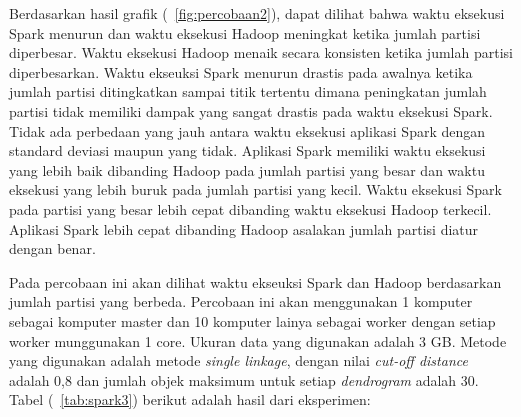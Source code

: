 Berdasarkan hasil grafik (~\ref{fig:percobaan2}), dapat dilihat bahwa waktu eksekusi Spark menurun dan waktu eksekusi Hadoop meningkat ketika jumlah partisi diperbesar. Waktu eksekusi Hadoop menaik secara konsisten ketika jumlah partisi diperbesarkan. Waktu ekseuksi Spark menurun drastis pada awalnya ketika jumlah partisi ditingkatkan sampai titik tertentu dimana peningkatan jumlah partisi tidak memiliki dampak yang sangat drastis pada waktu eksekusi Spark. Tidak ada perbedaan yang jauh antara waktu eksekusi aplikasi Spark dengan standard deviasi maupun yang tidak. Aplikasi Spark memiliki waktu eksekusi yang lebih baik dibanding Hadoop pada jumlah partisi yang besar dan waktu eksekusi yang lebih buruk pada jumlah partisi yang kecil. Waktu eksekusi Spark pada partisi yang besar lebih cepat dibanding waktu eksekusi Hadoop terkecil. Aplikasi Spark lebih cepat dibanding Hadoop asalakan jumlah partisi diatur dengan benar.






Pada percobaan ini akan dilihat waktu ekseuksi Spark dan Hadoop berdasarkan jumlah partisi yang berbeda. Percobaan ini akan menggunakan 1 komputer sebagai komputer master dan 10 komputer lainya sebagai worker dengan setiap worker munggunakan 1 core. Ukuran data yang digunakan adalah 3 GB. Metode yang digunakan adalah metode \textit{single linkage}, dengan nilai \textit{cut-off distance} adalah 0,8 dan jumlah objek maksimum untuk setiap \textit{dendrogram} adalah 30. Tabel (~\ref{tab:spark3}) berikut adalah hasil dari eksperimen:


